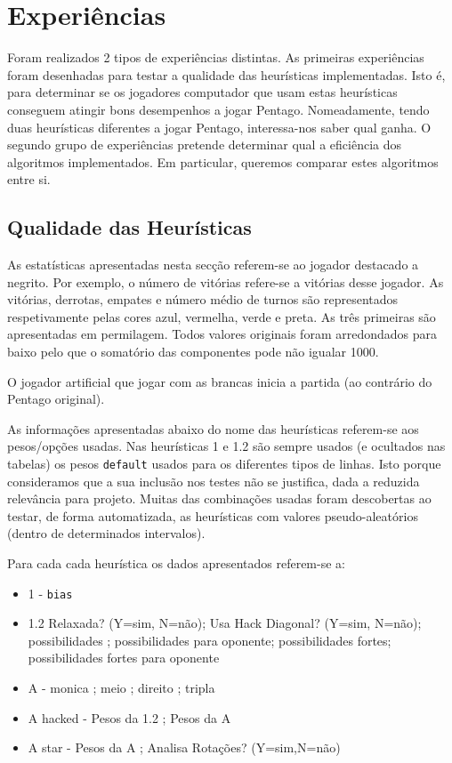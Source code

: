 
\section{Experiências}

Foram realizados 2 tipos de experiências distintas. As primeiras experiências foram desenhadas para testar a qualidade das heurísticas implementadas. Isto é, para determinar se os jogadores computador que usam estas heurísticas conseguem atingir bons desempenhos a jogar Pentago. Nomeadamente, tendo duas heurísticas diferentes a jogar Pentago, interessa-nos saber qual ganha. O segundo grupo de experiências pretende determinar qual a eficiência dos algoritmos implementados. Em particular, queremos comparar estes algoritmos entre si.

\subsection{Qualidade das Heurísticas}

As estatísticas apresentadas nesta secção referem-se ao jogador destacado a negrito. Por exemplo, o número de vitórias refere-se a vitórias desse jogador. As vitórias, derrotas, empates e número médio de turnos são representados respetivamente pelas cores azul, vermelha, verde e preta. As três primeiras são apresentadas em permilagem. Todos valores originais foram arredondados para baixo pelo que o somatório das componentes pode n\~ao igualar 1000\perthousand. 

O jogador artificial que jogar com as brancas inicia a partida (ao contrário do Pentago original). 

As informações apresentadas abaixo do nome das heurísticas referem-se aos pesos/opç\~oes usadas. Nas heurísticas 1 e 1.2 são sempre usados (e ocultados nas tabelas) os pesos \verb|default| usados para os diferentes tipos de linhas. Isto porque consideramos que a sua inclusão nos testes não se justifica, dada a reduzida relevância para projeto. Muitas das combinações usadas foram descobertas ao testar, de forma automatizada, as heurísticas com valores pseudo-aleatórios (dentro de determinados intervalos).

Para cada cada heurística os dados apresentados referem-se a:
\begin{itemize}  
	\item 1 - \verb|bias|
	\item 1.2 Relaxada? (Y=sim, N=não); Usa Hack Diagonal? (Y=sim, N=não); possibilidades ; possibilidades para oponente; possibilidades fortes; possibilidades fortes para oponente
	\item A - monica ; meio ; direito ; tripla
	\item A hacked - Pesos da 1.2 ; Pesos da A
	\item A star - Pesos da A ;  Analisa Rotaç\~oes? (Y=sim,N=não)
\end{itemize} 

